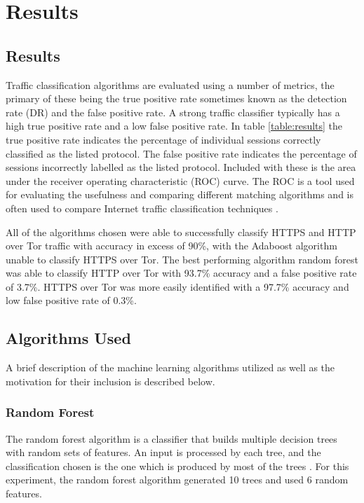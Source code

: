 \chapter{Results}

\section{Results}

Traffic classification algorithms are evaluated using a number of metrics, the
primary of these being the true positive rate sometimes known as the detection
rate (DR) and the false positive rate. A strong traffic classifier typically
has a high true positive rate and a low false positive rate. In table
\ref{table:results} the true positive rate indicates the percentage of
individual sessions correctly classified as the listed protocol. The false
positive rate indicates the percentage of sessions incorrectly labelled as the
listed protocol. Included with these is the area under the receiver operating
characteristic (ROC) curve. The ROC is a tool used for evaluating the
usefulness and comparing different matching algorithms and is often used to
compare Internet traffic classification techniques
\parencite{citeulike:167557,Nguyen:2008p3837}.

All of the algorithms chosen were able to successfully classify HTTPS and HTTP
over Tor traffic with accuracy in excess of 90\%, with the Adaboost algorithm
unable to classify HTTPS over Tor. The best performing algorithm random forest
was able to classify HTTP over Tor with 93.7\% accuracy and a false positive
rate of 3.7\%. HTTPS over Tor was more easily identified with a 97.7\% accuracy
and low false positive rate of 0.3\%.



\section{Algorithms Used}

A brief description of the machine learning algorithms utilized as well as the
motivation for their inclusion is described below.

\subsection{Random Forest}

The random forest algorithm is a classifier that builds multiple decision trees
with random sets of features. An input is processed by each tree, and the
classification chosen is the one which is produced by most of the trees
\parencite{Ho:1995vm}. For this experiment, the random forest algorithm
generated 10 trees and used 6 random features.


